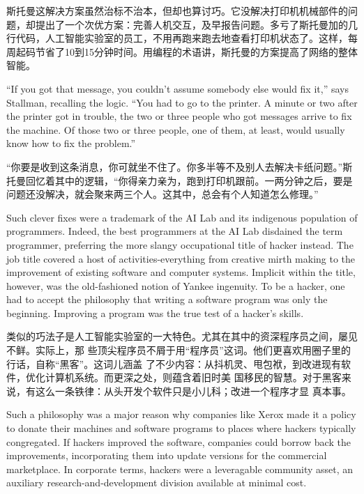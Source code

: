 \ifdefined\chs
斯托曼这解决方案虽然治标不治本，但却也算讨巧。它没解决打印机机械部件的问题，却提出了一个次优方案：完善人机交互，及早报告问题。多亏了斯托曼加的几行代码，人工智能实验室的员工，不用再跑来跑去地查看打印机状态了。这样，每周起码节省了10到15分钟时间。用编程的术语讲，斯托曼的方案提高了网络的整体智能。
\fi

\ifdefined\eng
``If you got that message, you couldn't assume somebody else would fix it,'' says Stallman, recalling the logic. ``You had to go to the printer. A minute or two after the printer got in trouble, the two or three people who got messages arrive to fix the machine. Of those two or three people, one of them, at least, would usually know how to fix the problem.''
\fi

\ifdefined\chs
``你要是收到这条消息，你可就坐不住了。你多半等不及别人去解决卡纸问题。''斯托曼回忆着其中的逻辑，``你得亲力亲为，跑到打印机跟前。一两分钟之后，要是问题还没解决，就会聚来两三个人。这其中，总会有个人知道怎么修理。''
\fi

\ifdefined\eng
Such clever fixes were a trademark of the AI Lab and its indigenous population of programmers. Indeed, the best programmers at the AI Lab disdained the term programmer, preferring the more slangy occupational title of hacker instead. The job title covered a host of activities-everything from creative mirth making to the improvement of existing software and computer systems. Implicit within the title, however, was the old-fashioned notion of Yankee ingenuity. To be a hacker, one had to accept the philosophy that writing a software program was only the beginning. Improving a program was the true test of a hacker's skills.
\fi

\ifdefined\chs
类似的巧法子是人工智能实验室的一大特色。尤其在其中的资深程序员之间，屡见不鲜。实际上，那
些顶尖程序员不屑于用``程序员''这词。他们更喜欢用圈子里的行话，自称``黑客''。这词儿涵盖
了不少内容：从抖机灵、甩包袱，到改进现有软件，优化计算机系统。而更深之处，则蕴含着旧时美
国移民的智慧。对于黑客来说，有这么一条铁律：从头开发个软件只是小儿科；改进一个程序才显
真本事。

\fi

\ifdefined\eng
Such a philosophy was a major reason why companies like Xerox made it a policy to donate their machines and software programs to places where hackers typically congregated. If hackers improved the software, companies could borrow back the improvements, incorporating them into update versions for the commercial marketplace. In corporate terms, hackers were a leveragable community asset, an auxiliary research-and-development division available at minimal cost.
\fi


